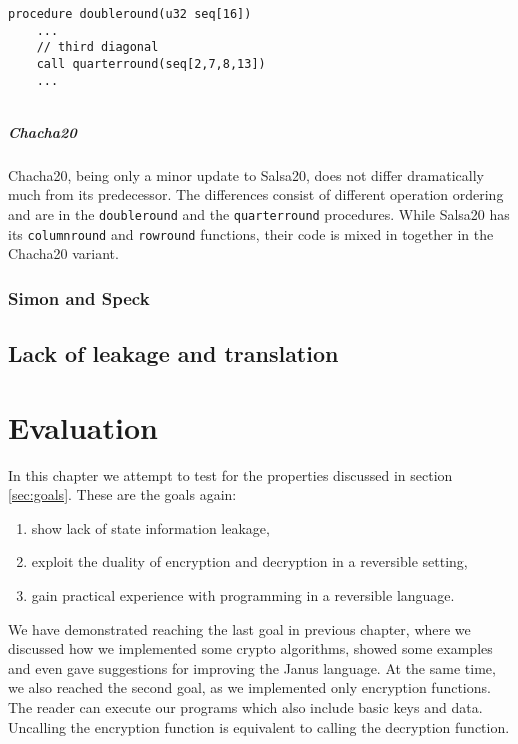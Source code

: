 \documentclass[a4paper,10pt,openright]{memoir}
\newcommand{\code}[1]{\texttt{#1}}
\begin{document}
\begin{lstlisting}[language=Janus]
procedure doubleround(u32 seq[16])
	...
	// third diagonal
	call quarterround(seq[2,7,8,13])
	...
\end{lstlisting}


\begin{lstlisting}[language=Janus]
\end{lstlisting}

\paragraph{Chacha20}

Chacha20, being only a minor update to Salsa20, does not differ 
dramatically much from its predecessor. The differences consist of 
different operation ordering and are in the \code{doubleround} and the 
\code{quarterround} procedures. While Salsa20 has its 
\code{columnround} and \code{rowround} functions, their code is mixed 
in together in the Chacha20 variant.




\subsection{Simon and Speck}


\section{Lack of leakage and translation}




\chapter{Evaluation}
\label{sec:eval}

In this chapter we attempt to test for the properties discussed in 
section \ref{sec:goals}. These are the goals again:

\begin{enumerate}
\item show lack of state information leakage,
\item exploit the duality of encryption and decryption in a reversible setting,
\item gain practical experience with programming in a reversible language.
\end{enumerate}

We have demonstrated reaching the last goal in previous chapter, where 
we discussed how we implemented some crypto algorithms, showed some 
examples and even gave suggestions for improving the Janus language. At 
the same time, we also reached the second goal, as we implemented only 
encryption functions. The reader can execute our programs which also 
include basic keys and data. Uncalling the encryption function is 
equivalent to calling the decryption function.
\end{document}
